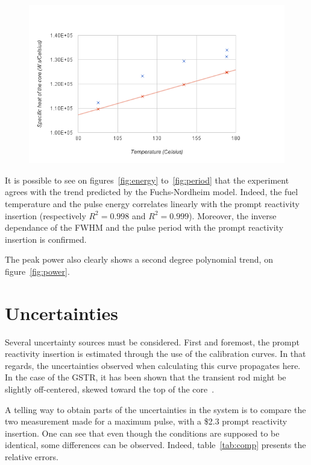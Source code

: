 \begin{figure}[t!]
	\centering
	\includegraphics[height=0.4\textheight]{fig02/cp.png}
	\label{fig:cp}
\end{figure}

It is possible to see on figures~\ref{fig:energy} to~\ref{fig:period} that the experiment agrees with the trend predicted by the Fuchs-Nordheim model. Indeed, the fuel temperature and the pulse energy correlates linearly with the prompt reactivity insertion (respectively $R^2 = 0.998$ and $R^2 = 0.999$). Moreover, the inverse dependance of the FWHM and the pulse period with the prompt reactivity insertion is confirmed.

The peak power also clearly shows a second degree polynomial trend, on figure~\ref{fig:power}.


\section{Uncertainties}

Several uncertainty sources must be considered. First and foremost, the prompt reactivity insertion is estimated through the use of the calibration curves. In that regards, the uncertainties observed when calculating this curve propagates here. In the case of the GSTR, it has been shown that the transient rod might be slightly off-centered, skewed toward the top of the core~\cite{lher01}.

A telling way to obtain parts of the uncertainties in the system is to compare the two measurement made for a maximum pulse, with a \$2.3 prompt reactivity insertion. One can see that even though the conditions are supposed to be identical, some differences can be observed. Indeed, table~\ref{tab:comp} presents the relative errors.

